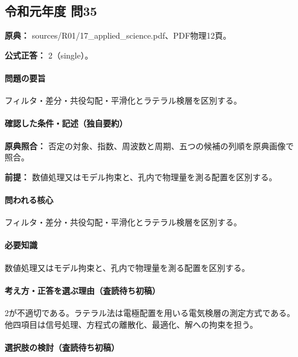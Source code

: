 \subsection{令和元年度 問35}
\label{q:r01-reg-applied-35}

\noindent\textbf{原典：} sources/R01/17\_applied\_science.pdf、PDF物理12頁。

\textbf{公式正答：} 2（single）。

\paragraph{問題の要旨} フィルタ・差分・共役勾配・平滑化とラテラル検層を区別する。

\paragraph{確認した条件・記述（独自要約）}\mbox{}\par

\noindent\textbf{原典照合：} 否定の対象、指数、周波数と周期、五つの候補の列順を原典画像で照合。\par

\noindent\textbf{前提：} 数値処理又はモデル拘束と、孔内で物理量を測る配置を区別する。\par

\paragraph{問われる核心} フィルタ・差分・共役勾配・平滑化とラテラル検層を区別する。

\paragraph{必要知識} 数値処理又はモデル拘束と、孔内で物理量を測る配置を区別する。

\paragraph{考え方・正答を選ぶ理由（査読待ち初稿）} 2が不適切である。ラテラル法は電極配置を用いる電気検層の測定方式である。他四項目は信号処理、方程式の離散化、最適化、解への拘束を担う。

\paragraph{選択肢の検討（査読待ち初稿）}\mbox{}\par


